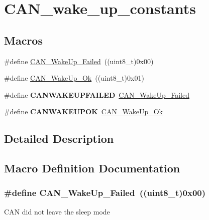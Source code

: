 \hypertarget{group___c_a_n__wake__up__constants}{\section{C\-A\-N\-\_\-wake\-\_\-up\-\_\-constants}
\label{group___c_a_n__wake__up__constants}
}
\subsection*{Macros}
\begin{DoxyCompactItemize}
\item 
\#define \hyperlink{group___c_a_n__wake__up__constants_ga837fd7ad47fee78e43a186544e2b390b}{C\-A\-N\-\_\-\-Wake\-Up\-\_\-\-Failed}~((uint8\-\_\-t)0x00)
\item 
\#define \hyperlink{group___c_a_n__wake__up__constants_ga152e4935cf85bdfb803eb36b656cd690}{C\-A\-N\-\_\-\-Wake\-Up\-\_\-\-Ok}~((uint8\-\_\-t)0x01)
\item 
\hypertarget{group___c_a_n__wake__up__constants_ga0de3b0e2c544d9fa772b646e331e51b1}{\#define {\bfseries C\-A\-N\-W\-A\-K\-E\-U\-P\-F\-A\-I\-L\-E\-D}~\hyperlink{group___c_a_n__wake__up__constants_ga837fd7ad47fee78e43a186544e2b390b}{C\-A\-N\-\_\-\-Wake\-Up\-\_\-\-Failed}}\label{group___c_a_n__wake__up__constants_ga0de3b0e2c544d9fa772b646e331e51b1}

\item 
\hypertarget{group___c_a_n__wake__up__constants_gafed6ab4dbb00c9d63f6a7cdf323f33ef}{\#define {\bfseries C\-A\-N\-W\-A\-K\-E\-U\-P\-O\-K}~\hyperlink{group___c_a_n__wake__up__constants_ga152e4935cf85bdfb803eb36b656cd690}{C\-A\-N\-\_\-\-Wake\-Up\-\_\-\-Ok}}\label{group___c_a_n__wake__up__constants_gafed6ab4dbb00c9d63f6a7cdf323f33ef}

\end{DoxyCompactItemize}


\subsection{Detailed Description}


\subsection{Macro Definition Documentation}
\hypertarget{group___c_a_n__wake__up__constants_ga837fd7ad47fee78e43a186544e2b390b}{
\subsubsection[{C\-A\-N\-\_\-\-Wake\-Up\-\_\-\-Failed}]{\setlength{\rightskip}{0pt plus 5cm}\#define C\-A\-N\-\_\-\-Wake\-Up\-\_\-\-Failed~((uint8\-\_\-t)0x00)}}\label{group___c_a_n__wake__up__constants_ga837fd7ad47fee78e43a186544e2b390b}
C\-A\-N did not leave the sleep mode 

